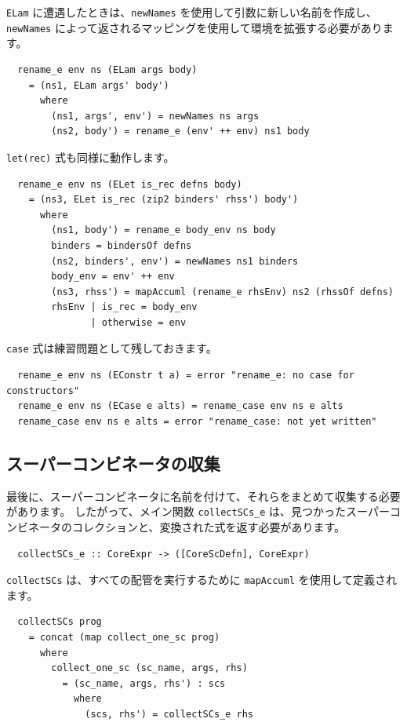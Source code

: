 \documentclass{jbook}
\begin{document}
\texttt{ELam} に遭遇したときは、\texttt{newNames} を使用して引数に新しい名前を作成し、
\texttt{newNames} によって返されるマッピングを使用して環境を拡張する必要があります。

\begin{verbatim}
  rename_e env ns (ELam args body)
    = (ns1, ELam args' body')
      where
        (ns1, args', env') = newNames ns args
        (ns2, body') = rename_e (env' ++ env) ns1 body
\end{verbatim}

\texttt{let(rec)} 式も同様に動作します。

\begin{verbatim}
  rename_e env ns (ELet is_rec defns body)
    = (ns3, ELet is_rec (zip2 binders' rhss') body')
      where
        (ns1, body') = rename_e body_env ns body
        binders = bindersOf defns
        (ns2, binders', env') = newNames ns1 binders
        body_env = env' ++ env
        (ns3, rhss') = mapAccuml (rename_e rhsEnv) ns2 (rhssOf defns)
        rhsEnv | is_rec = body_env
               | otherwise = env
\end{verbatim}

\texttt{case} 式は練習問題として残しておきます。

\begin{verbatim}
  rename_e env ns (EConstr t a) = error "rename_e: no case for constructors"
  rename_e env ns (ECase e alts) = rename_case env ns e alts
  rename_case env ns e alts = error "rename_case: not yet written"
\end{verbatim}

\subsection{スーパーコンビネータの収集}

最後に、スーパーコンビネータに名前を付けて、それらをまとめて収集する必要があります。
したがって、メイン関数 \texttt{collectSCs\_e} は、見つかったスーパーコンビネータのコレクションと、変換された式を返す必要があります。

\begin{verbatim}
  collectSCs_e :: CoreExpr -> ([CoreScDefn], CoreExpr)
\end{verbatim}

\texttt{collectSCs} は、すべての配管を実行するために \texttt{mapAccuml} を使用して定義されます。

\begin{verbatim}
  collectSCs prog
    = concat (map collect_one_sc prog)
      where
        collect_one_sc (sc_name, args, rhs)
          = (sc_name, args, rhs') : scs
            where
              (scs, rhs') = collectSCs_e rhs
\end{verbatim}
\newpage
\end{document}
